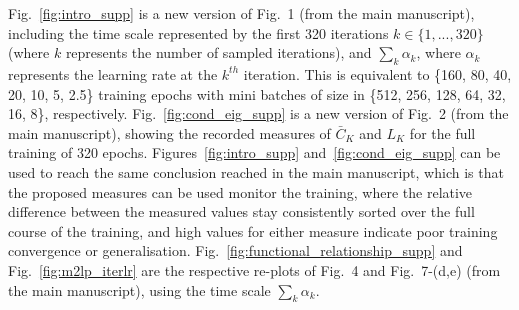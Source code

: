 \documentclass[10pt,journal,compsoc]{IEEEtran}
\begin{document}
Fig.~\ref{fig:intro_supp} is a new version of Fig.~1 (from the main manuscript), including the time scale represented by the first 320 iterations $k \in \{1,...,320\}$ (where $k$ represents the number of sampled iterations),
and $\sum_k \alpha_k$, where $\alpha_k$ represents the learning rate at the $k^{th}$ iteration.
This is equivalent to \{160, 80, 40, 20, 10, 5, 2.5\} training epochs with mini batches of size in \{512, 256, 128, 64, 32, 16, 8\}, respectively.
Fig.~\ref{fig:cond_eig_supp} is a new version of Fig.~2 (from the main manuscript), showing the recorded measures of $\bar C_K$ and $L_K$ for the full training of 320 epochs.
Figures~\ref{fig:intro_supp} and~\ref{fig:cond_eig_supp} can be used to reach the same conclusion reached in the main manuscript, which is that the proposed measures can be used monitor the training, where the relative difference between the measured values stay consistently sorted over the full course of the training, and high values for either measure indicate poor training convergence or generalisation.
Fig.~\ref{fig:functional_relationship_supp} and Fig.~\ref{fig:m2lp_iterlr} are the respective re-plots of Fig.~4 and Fig.~7-(d,e) (from the main manuscript), using the time scale $\sum_k \alpha_k$.
\end{document}
